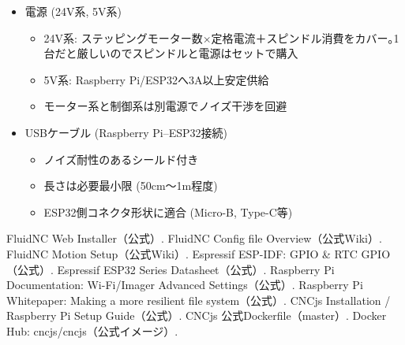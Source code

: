 \documentclass[uplatex,dvipdfmx]{ujarticle}
\begin{document}
\begin{itemize}
  \item 電源 (24V系, 5V系)
    \begin{itemize}
      \item 24V系: ステッピングモーター数×定格電流＋スピンドル消費をカバー｡1台だと厳しいのでスピンドルと電源はセットで購入
      \item 5V系: Raspberry Pi/ESP32へ3A以上安定供給
      \item モーター系と制御系は別電源でノイズ干渉を回避
    \end{itemize}

  \item USBケーブル (Raspberry Pi–ESP32接続)
    \begin{itemize}
      \item ノイズ耐性のあるシールド付き
      \item 長さは必要最小限 (50cm～1m程度)
      \item ESP32側コネクタ形状に適合 (Micro-B, Type-C等)
    \end{itemize}
\end{itemize}



\begin{thebibliography}{999}
 FluidNC Web Installer（公式）.
 FluidNC Config file Overview（公式Wiki）.
 FluidNC Motion Setup（公式Wiki）.
 Espressif ESP-IDF: GPIO \& RTC GPIO（公式）.
 Espressif ESP32 Series Datasheet（公式）.
 Raspberry Pi Documentation: Wi-Fi/Imager Advanced Settings（公式）.
 Raspberry Pi Whitepaper: Making a more resilient file system（公式）.
 CNCjs Installation / Raspberry Pi Setup Guide（公式）.
 CNCjs 公式Dockerfile（master）.
 Docker Hub: cncjs/cncjs（公式イメージ）.
\end{thebibliography}
\end{document}
